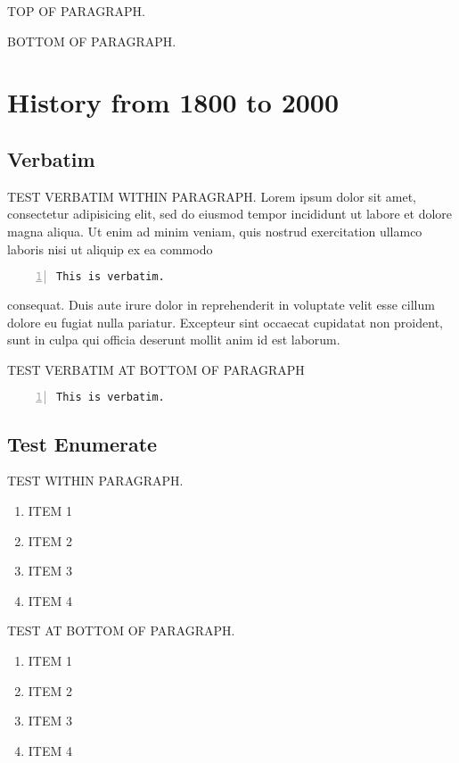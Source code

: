 TOP OF PARAGRAPH.
\begin{thm}
\lipsum[10]
\end{thm}
\noindent
\lipsum[1]

BOTTOM OF PARAGRAPH.
\lipsum[1]
\begin{thm}
\lipsum[10]
\end{thm}


\chapter{History from 1800 to 2000}

\section{Verbatim}
TEST VERBATIM WITHIN PARAGRAPH.
Lorem ipsum dolor sit amet, consectetur adipisicing elit, sed do eiusmod 
tempor incididunt ut labore et dolore magna aliqua. Ut enim ad minim veniam, 
quis nostrud exercitation ullamco laboris nisi ut aliquip ex ea commodo 
\begin{Verbatim}[frame=single, numbers=left]
This is verbatim.
\end{Verbatim}
consequat. Duis aute irure dolor in reprehenderit in voluptate velit esse 
cillum dolore eu fugiat nulla pariatur. Excepteur sint occaecat cupidatat non 
proident, sunt in culpa qui officia deserunt mollit anim id est laborum.

TEST VERBATIM AT BOTTOM OF PARAGRAPH
\lipsum[1]
\begin{Verbatim}[frame=single, numbers=left]
This is verbatim.
\end{Verbatim}

\section{Test Enumerate}
TEST WITHIN PARAGRAPH.
\lipsum[1]
\begin{enumerate}
\item ITEM 1
\item ITEM 2
\item ITEM 3
\item ITEM 4
\end{enumerate}
\lipsum[2]


TEST AT BOTTOM OF PARAGRAPH.
\lipsum[1]
\begin{enumerate}
\item ITEM 1
\item ITEM 2
\item ITEM 3
\item ITEM 4
\end{enumerate}

